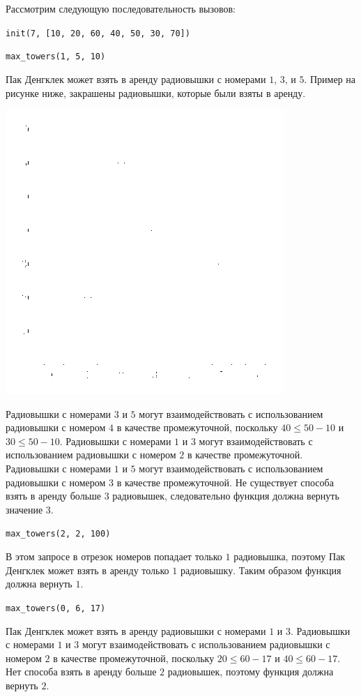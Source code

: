 
Рассмотрим следующую последовательность вызовов:

\texttt{init(7, [10, 20, 60, 40, 50, 30, 70])}

\texttt{max\_towers(1, 5, 10)}

Пак Денгклек может взять в аренду радиовышки с номерами $1$, $3$, и $5$.
Пример на рисунке ниже, закрашены радиовышки, которые были взяты в аренду.

\includegraphics{towers-example.png}

Радиовышки с номерами $3$ и $5$ могут взаимодействовать с использованием радиовышки с номером $4$ в качестве промежуточной, поскольку $40 \le 50 - 10$ и $30 \le 50 - 10$.
Радиовышки с номерами $1$ и $3$ могут взаимодействовать с использованием радиовышки с номером $2$ в качестве промежуточной.
Радиовышки с номерами $1$ и $5$ могут взаимодействовать с использованием радиовышки с номером $3$ в качестве промежуточной.
Не существует способа взять в аренду больше $3$ радиовышек, следовательно функция должна вернуть значение $3$.

\texttt{max\_towers(2, 2, 100)}

В этом запросе в отрезок номеров попадает только $1$ радиовышка, поэтому Пак Денгклек может взять в аренду только $1$ радиовышку.
Таким образом функция должна вернуть $1$.

\texttt{max\_towers(0, 6, 17)}

Пак Денгклек может взять в аренду радиовышки с номерами $1$ и $3$.
Радиовышки с номерами $1$ и $3$ могут взаимодействовать с использованием радиовышки с номером $2$ в качестве промежуточной, поскольку $20 \le 60 - 17$ и $40 \le 60 - 17$.
Нет способа взять в аренду больше $2$ радиовышек, поэтому функция должна вернуть $2$.

